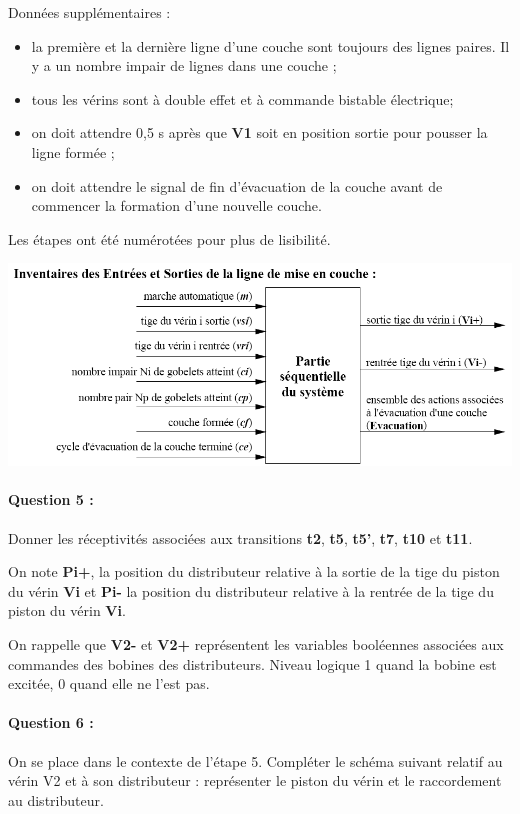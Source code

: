 Données supplémentaires :
\begin{itemize}
 \item la première et la dernière ligne d'une couche sont toujours des lignes paires. Il y a un nombre impair de lignes dans une couche ;
 \item tous les vérins sont à double effet et à commande bistable électrique;
 \item on doit attendre 0,5 s après que \textbf{V1} soit en position sortie pour pousser la ligne formée ;
 \item on doit attendre le signal de fin d'évacuation de la couche avant de commencer la formation d'une nouvelle couche.
\end{itemize}

Les étapes ont été numérotées pour plus de lisibilité.

 \includegraphics[width=0.7\linewidth]{img/Inventaire.png}

\paragraph{Question 5 :} Donner les réceptivités associées aux transitions \textbf{t2}, \textbf{t5}, \textbf{t5'}, \textbf{t7}, \textbf{t10} et \textbf{t11}.

On note \textbf{Pi+}, la position du distributeur relative à la sortie de la tige du piston du vérin \textbf{Vi} et \textbf{Pi-} la position du distributeur relative à la rentrée de la tige du piston du vérin \textbf{Vi}.

On rappelle que \textbf{V2-} et \textbf{V2+} représentent les variables booléennes associées aux commandes des bobines des distributeurs. Niveau logique 1 quand la bobine est excitée, 0 quand elle ne l'est pas.

\paragraph{Question 6 :} On se place dans le contexte de l'étape 5. Compléter le schéma suivant relatif au vérin V2 et à son distributeur : représenter le piston du vérin et le raccordement au distributeur.

